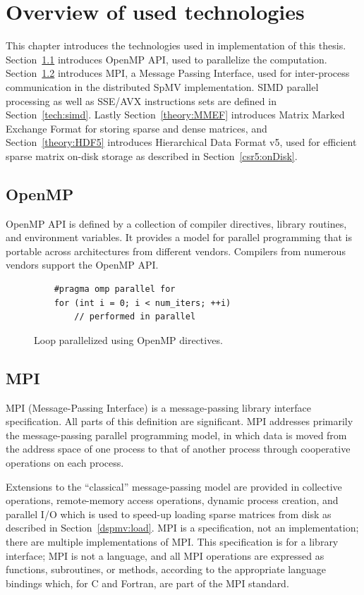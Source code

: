 \documentclass[thesis=M,english]{FITthesis}[2019/12/23]
\begin{document}
\chapter{Overview of used technologies}\label{tech}

This chapter introduces the technologies used in implementation of this thesis. Section~\ref{tech:omp} introduces
OpenMP API, used to parallelize the computation. Section~\ref{tech:mpi} introduces MPI, a Message Passing
Interface, used for inter-process communication in the distributed SpMV implementation. SIMD parallel
processing as well as SSE/AVX instructions sets are defined in Section~\ref{tech:simd}. Lastly
Section~\ref{theory:MMEF} introduces Matrix Marked Exchange Format for storing sparse and dense matrices,
and Section~\ref{theory:HDF5} introduces Hierarchical Data Format v5, used for efficient sparse matrix
on-disk storage as described in Section~\ref{csr5:onDisk}.

\section{OpenMP}\label{tech:omp}

OpenMP API is defined by a collection of compiler directives, library routines, and environment variables.
It provides a model for parallel programming that is portable across architectures
from different vendors. Compilers from numerous vendors support the OpenMP API\cite{openmp18}.

\begin{figure}[htp]
    \begin{verbatim}
    #pragma omp parallel for
    for (int i = 0; i < num_iters; ++i)
        // performed in parallel
    \end{verbatim}
    \caption{Loop parallelized using OpenMP directives.}
\end{figure}


\section{MPI}\label{tech:mpi}

MPI (Message-Passing Interface) is a message-passing library interface specification.
All parts of this definition are significant. MPI addresses primarily the message-passing parallel
programming model, in which data is moved from the address space of one process to
that of another process through cooperative operations on each process.

Extensions to the
“classical” message-passing model are provided in collective operations, remote-memory
access operations, dynamic process creation, and parallel I/O which is used to speed-up loading
sparse matrices from disk as described in Section~\ref{dspmv:load}. MPI is a specification, not
an implementation; there are multiple implementations of MPI. This specification is for a
library interface; MPI is not a language, and all MPI operations are expressed as functions,
subroutines, or methods, according to the appropriate language bindings which, for C and
Fortran, are part of the MPI standard.
\cite{mpi40}
\end{document}
